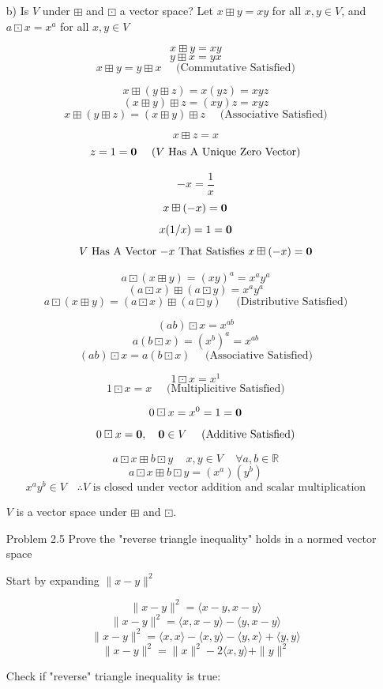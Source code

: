 \documentclass[12pt]{article}
\begin{document}
\begin{enumerate}
b) Is $V$ under $\boxplus$ and $\boxdot$ a vector space? Let
$x\boxplus y=xy$ for all $x,y\in V$, and $a\boxdot x=x^a$ for all $x,y\in V$

\[x\boxplus y=xy\]
\[y\boxplus x=yx\]
\[x\boxplus y=y\boxplus x\quad\text{ (Commutative Satisfied)}\]

\[x\boxplus (y\boxplus z)=x(yz)=xyz\]
\[(x\boxplus y)\boxplus z=(xy)z=xyz\]
\[x\boxplus (y\boxplus z)=(x\boxplus y)\boxplus z\quad\text{ (Associative Satisfied)}\]

\[x\boxplus z=x\]
\[z=1=\bold{0}\quad\text{ ($V$ Has A Unique Zero Vector)}\]

\[-x=\frac{1}{x}\]
\[x\boxplus(-x)=\bold{0}\]
\[x(1/x)=1=\bold{0}\]
\[\text{$V$ Has A Vector $-x$ That Satisfies $x\boxplus (-x)=\bold{0}$}\]

\[a\boxdot (x\boxplus y)=(xy)^a=x^ay^a\]
\[(a\boxdot x)\boxplus (a\boxdot y)=x^ay^a\]
\[a\boxdot (x\boxplus y)=(a\boxdot x)\boxplus (a\boxdot y)\quad\text{ (Distributive Satisfied)}\]

\[(ab)\boxdot x=x^{ab}\]
\[a(b\boxdot x)=(x^b)^a=x^{ab}\]
\[(ab)\boxdot x=a(b\boxdot x)\quad\text{ (Associative Satisfied)}\]

\[1\boxdot x=x^1\]
\[1\boxdot x=x\quad\text{ (Multiplicitive Satisfied)}\]

\[0\boxdot x=x^0=1=\bold{0}\]
\[0\boxdot x=\bold{0},\quad\bold{0}\in V\quad\text{ (Additive Satisfied)}\]

\[a\boxdot x\boxplus b\boxdot y\, \quad x,y\in V\, \quad \forall a,b\in\mathbb{R}\]
\[a\boxdot x\boxplus b\boxdot y=(x^a)(y^b)\]
\[x^ay^b \in V\quad\therefore\text{$V$ is closed under vector addition and scalar multiplication}\]

\begin{framed}
$V$ is a vector space under $\boxplus$ and $\boxdot$.
\end{framed}

\newpage

\item[Problem 2.5] Prove the "reverse triangle inequality" holds in a normed vector space

Start by expanding $\|x-y\|^2$

\[\|x-y\|^2=\langle x-y,x-y\rangle\]
\[\|x-y\|^2=\langle x,x-y\rangle-\langle y,x-y\rangle\]
\[\|x-y\|^2=\langle x,x\rangle-\langle x,y\rangle-\langle y,x\rangle+\langle y,y\rangle\]
\[\|x-y\|^2=\|x\|^2-2\langle x,y\rangle+\|y\|^2\]

Check if "reverse" triangle inequality is true:


\end{enumerate}
\end{document}
